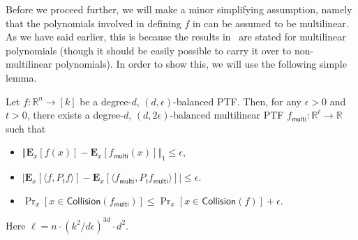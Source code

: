 \documentclass{toc}
\begin{document}
Before we proceed further, we will make a minor simplifying assumption, namely that the polynomials involved in defining $f$ in  can be assumed to be multilinear. As we have said earlier, this is because the results in~\cite{DS14} are stated for multilinear polynomials (though it should be easily possible to carry it over to non-multilinear polynomials). In order to show this, we will use the following simple lemma. 
\begin{lemma}\label{lem:multilinear} 
Let $f: \mathbb{R}^n \rightarrow [k]$ be a degree-$d$, $(d,\epsilon)$-balanced PTF\@. Then, for any $\epsilon>0$ and $t > 0$, there exists a degree-$d$, $(d,2\epsilon)$-balanced multilinear PTF $f_{\mathsf{multi}}: \mathbb{R}^\ell \rightarrow \mathbb{R}$ such that 
\begin{itemize}
\item $\Vert \mathbf{E}_{x } [f(x) ] - \mathbf{E}_{x } [f_{\mathsf{multi}}(x)  ] \Vert_1\le \epsilon$, 
\item $| \mathbf{E}_{x } [ \langle f, P_t  f \rangle ] - \mathbf{E}_{x } [\langle f_{\mathsf{multi}}, P_t f_{\mathsf{multi}}\rangle ] | \le \epsilon$.
\item $\Pr_{x } [x \in \mathsf{Collision}(f_{\mathsf{multi}})] \le \Pr_{x } [x \in \mathsf{Collision}(f)]  + \epsilon$.
\end{itemize}
Here $\ell = n \cdot (k^2/d \epsilon)^{3d} \cdot d^2$. 
\end{lemma}
\end{document}
